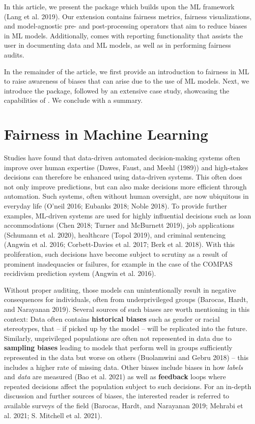 In this article, we present the  package which builds upon the ML framework  (Lang et al. 2019).
Our extension contains fairness metrics, fairness visualizations, and model-agnostic pre- and post-processing operators that aim to reduce biases in ML models.
Additionally,  comes with reporting functionality that assists the user in documenting data and ML models, as well as in performing fairness audits.

In the remainder of the article, we first provide an introduction to fairness in ML to raise awareness of biases that can arise due to the use of ML models.
Next, we introduce the  package, followed by an extensive case study, showcasing the capabilities of .
We conclude with a summary.

\hypertarget{fairness-in-machine-learning}{%
\section{Fairness in Machine Learning}\label{fairness-in-machine-learning}}

Studies have found that data-driven automated decision-making systems often improve over human expertise (Dawes, Faust, and Meehl (1989)) and high-stakes decisions can therefore be enhanced using data-driven systems.
This often does not only improve predictions, but can also make decisions more efficient through automation.
Such systems, often without human oversight, are now ubiquitous in everyday life (O'neil 2016; Eubanks 2018; Noble 2018).
To provide further examples, ML-driven systems are used for highly influential decisions such as loan accommodations (Chen 2018; Turner and McBurnett 2019), job applications (Schumann et al. 2020), healthcare (Topol 2019), and criminal sentencing (Angwin et al. 2016; Corbett-Davies et al. 2017; Berk et al. 2018).
With this proliferation, such decisions have become subject to scrutiny as a result of prominent inadequacies or failures, for example in the case of the COMPAS recidivism prediction system (Angwin et al. 2016).

Without proper auditing, those models can unintentionally result in negative consequences for individuals, often from underprivileged groups (Barocas, Hardt, and Narayanan 2019).
Several sources of such biases are worth mentioning in this context:
Data often contains \textbf{historical biases} such as gender or racial stereotypes, that -- if picked up by the model -- will be replicated into the future.
Similarly, unprivileged populations are often not represented in data due to \textbf{sampling biases} leading to models that perform well in groups sufficiently represented in the data but worse on others (Buolamwini and Gebru 2018) -- this includes a higher rate of missing data.
Other biases include biases in how \emph{labels} and \emph{data} are measured (Bao et al. 2021) as well as \textbf{feedback} loops where repeated decisions affect the population subject to such decisions.
For an in-depth discussion and further sources of biases, the interested reader is referred to available surveys of the field (Barocas, Hardt, and Narayanan 2019; Mehrabi et al. 2021; S. Mitchell et al. 2021).

